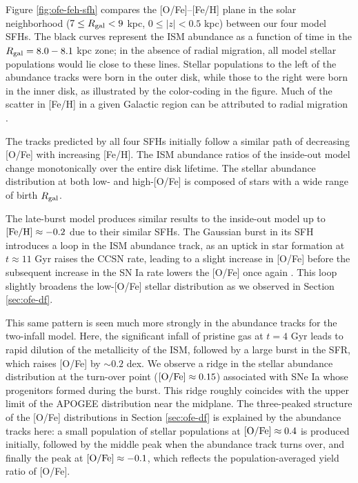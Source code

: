\documentclass[twocolumn,twocolappendix,linenumbers]{aastex631}
\begin{document}
Figure \ref{fig:ofe-feh-sfh} compares the [O/Fe]--[Fe/H] plane in the solar neighborhood ($7\leq R_{\rm gal}<9$ kpc, $0\leq|z|<0.5$ kpc) between our four model SFHs. The black curves represent the ISM abundance as a function of time in the $R_{\rm gal}=8.0-8.1$ kpc zone; in the absence of radial migration, all model stellar populations would lie close to these lines. Stellar populations to the left of the abundance tracks were born in the outer disk, while those to the right were born in the inner disk, as illustrated by the color-coding in the figure. Much of the scatter in [Fe/H] in a given Galactic region can be attributed to radial migration \citep{Edvardsson1993-ChemicalEvolution}.

The tracks predicted by all four SFHs initially follow a similar path of decreasing [O/Fe] with increasing [Fe/H]. The ISM abundance ratios of the inside-out model change monotonically over the entire disk lifetime. The stellar abundance distribution at both low- and high-[O/Fe] is composed of stars with a wide range of birth $R_{\rm gal}$. 

The late-burst model produces similar results to the inside-out model up to ${\rm [Fe/H]}\approx-0.2$ due to their similar SFHs. The Gaussian burst in its SFH introduces a loop in the ISM abundance track, as an uptick in star formation at $t\approx11$ Gyr raises the CCSN rate, leading to a slight increase in [O/Fe] before the subsequent increase in the SN Ia rate lowers the [O/Fe] once again \citep[see e.g. Figure 1 of][]{JohnsonWeinberg2020-Starbursts}. This loop slightly broadens the low-[O/Fe] stellar distribution as we observed in Section \ref{sec:ofe-df}.

This same pattern is seen much more strongly in the abundance tracks for the two-infall model. Here, the significant infall of pristine gas at $t=4$ Gyr leads to rapid dilution of the metallicity of the ISM, followed by a large burst in the SFR, which raises [O/Fe] by $\sim 0.2$ dex. We observe a ridge in the stellar abundance distribution at the turn-over point (${\rm [O/Fe]}\approx0.15$) associated with SNe Ia whose progenitors formed during the burst. This ridge roughly coincides with the upper limit of the APOGEE distribution near the midplane. The three-peaked structure of the [O/Fe] distributions in Section \ref{sec:ofe-df} is explained by the abundance tracks here: a small population of stellar populations at ${\rm [O/Fe]}\approx0.4$ is produced initially, followed by the middle peak when the abundance track turns over, and finally the peak at ${\rm [O/Fe]}\approx-0.1$, which reflects the population-averaged yield ratio of [O/Fe].
\end{document}
